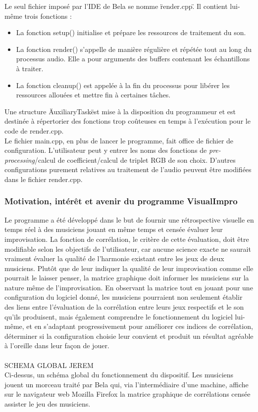 Le seul fichier imposé par l'IDE de Bela se nomme \"render.cpp\". Il
contient lui-même trois fonctions :
\begin{itemize}
 \item La fonction setup() initialise et prépare les ressources de
       traitement du son.
 \item La fonction render() s'appelle de manière régulière et répétée
       tout au long du processus audio. Elle a pour arguments des buffers
       contenant les échantillons à traiter.
 \item La fonction cleanup() est appelée à la fin du processus pour
       libérer les ressources allouées et mettre fin à certaines tâches.
\end{itemize}

Une structure \"AuxiliaryTask\" est mise à la disposition du
programmeur et est destinée à répertorier des fonctions trop coûteuses
en temps à l'exécution pour le code de render.cpp. \\

Le fichier main.cpp, en plus de lancer le programme, fait office de
fichier de configuration. L'utilisateur peut y entrer les noms des
fonctions de \textit{pre-processing}/calcul de coefficient/calcul de
triplet RGB de son choix. D'autres configurations purement relatives
au traitement de l'audio peuvent être modifiées dans le fichier
render.cpp.

\subsubsection{Motivation, intérêt et avenir du programme VisualImpro}
Le programme a été développé dans le but de fournir une rétrospective
visuelle en temps réel à des musiciens jouant en même temps et censée
évaluer leur improvisation. La fonction de corrélation, le critère de
cette évaluation, doit être modifiable selon les objectifs de
l'utilisateur, car aucune science exacte ne saurait vraiment évaluer
la qualité de l'harmonie existant entre les jeux de deux
musiciens. Plutôt que de leur indiquer la qualité de leur
improvisation comme elle pourrait le laisser penser, la matrice
graphique doit informer les musiciens sur la nature même de
l'improvisation. En observant la matrice tout en jouant pour une
configuration du logiciel donné, les musiciens pourraient non
seulement établir des liens entre l'évaluation de la corrélation entre
leurs jeux respectifs et le son qu'ils produisent, mais également
comprendre le fonctionnement du logiciel lui-même, et en s'adaptant
progressivement pour améliorer ces indices de corrélation, déterminer
si la configuration choisie leur convient et produit un résultat
agréable à l'oreille dans leur façon de jouer. \\
\\
SCHEMA GLOBAL JEREM
\\
Ci-dessus, un schéma global du fonctionnement du dispositif. Les
musiciens jouent un morceau traité par Bela qui, via l'intermédiaire
d'une machine, affiche sur le navigateur web Mozilla Firefox la
matrice graphique de corrélations censée assister le jeu des
musiciens. \\

